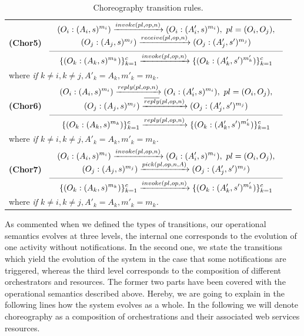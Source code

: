 \begin{table}[!ht]
{{\begin{tabular}{l}

\\[0.7cm]

\hspace{0.6cm}\textbf{(Chor5)}
$\reglaa{ %
(O_i:(A_i,s)^{m_i}) \xrightarrow{invoke(pl,op,n)} (O_i:(A'_i,s)^{m_i}),\ pl=(O_i,O_j),\\
(O_j:(A_j,s)^{m_j}) \xrightarrow{receive(pl,op,n)} (O_j:(A'_j,s')^{m_j})
}
{ %
\{(O_k:(A_k,s)^{m_k})\}_{k=1}^c
\xrightarrow{invoke(pl,op,n)}
\{(O_k:(A'_k,s')^{m'_k})\}_{k=1}^c
}{10}$
\\[0.7cm]
\hspace{2.cm}where  \it{if} $k\neq i,k\neq j, A'_k=A_k,m'_k=m_k$.

\\[0.2cm]

\hspace{0.6cm}\textbf{(Chor6)}
$\reglaa{ %
(O_i:(A_i,s)^{m_i}) \xrightarrow{reply(pl,op,n)} (O_i:(A'_i,s)^{m_i}),\ pl=(O_i,O_j),\\
(O_j:(A_j,s)^{m_j}) \xrightarrow{\overline{reply}(pl,op,n)} (O_j:(A'_j,s')^{m_j})
}
{ %
\{(O_k:(A_k,s)^{m_k})\}_{k=1}^c
\xrightarrow{reply(pl,op,n)}
\{(O_k:(A'_k,s')^{m'_k})\}_{k=1}^c
}{10}$\\[0.7cm]
\hspace{2.cm}where  \it{if} $k\neq i,k\neq j, A'_k=A_k,m'_k=m_k$.

\\[0.2cm]

\hspace{0.6cm}\textbf{(Chor7)}
$\reglaa{ %
(O_i:(A_i,s)^{m_i}) \xrightarrow{invoke(pl,op,n)} (O_i:(A'_i,s)^{m_i}),\ pl=(O_i,O_j),\\
(O_j:(A_j,s)^{m_j}) \xrightarrow{pick(pl,op,n,A)} (O_j:(A'_j,s')^{m_j})
}
{ %
\{(O_k:(A_k,s)^{m_k})\}_{k=1}^c
\xrightarrow{invoke(pl,op,n)}
\{(O_k:(A'_k,s')^{m'_k})\}_{k=1}^c
}{10}$\\[0.7cm]
\hspace{2.cm}where  \it{if} $k\neq i,k\neq j, A'_k=A_k,m'_k=m_k$.
\\[0.4cm]

\end{tabular}
}}
\caption{\label{tab:coreo}Choreography transition rules.}
\end{table}
As commented when we defined the types of transitions, our operational semantics evolves at three levels, the internal one corresponds to the evolution of one activity without notifications. In the second one, we state the transitions which yield the evolution of the system in the case that some notifications are triggered, whereas the third level corresponds to the composition of different orchestrators and resources. The former two parts have been covered with the operational semantics described above. Hereby, we are going to explain in the following lines how the system evolves as a whole. In the following we will denote choreography as a composition of orchestrations and their associated web services resources.
